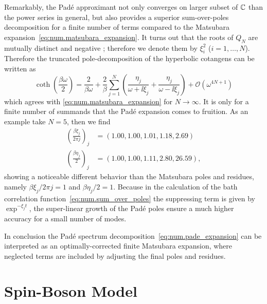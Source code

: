 Remarkably, the Padé approximant not only converges on larger subset of $\mathbb{C}$ than the power series in general, but also provides a superior sum-over-poles decomposition for a finite number of terms compared to the Matsubara expansion~\ref{eq:num.matsubara_expansion}.
It turns out that the roots of $Q_N$ are mutually distinct and negative \cite{HuXuYa10_pade}; therefore we denote them by $\xi_i^2$ ($i=1,\dots,N$).
Therefore the truncated pole-decomposition of the hyperbolic cotangens can be written as
\begin{equation}
  \coth\left( \frac{\beta\omega}{2} \right) = \frac{2}{\beta\omega} + \frac{2}{\beta} \sum_{j=1}^N \left( \frac{\eta_j}{\omega + \ii\xi_j} + \frac{\eta_j}{\omega - \ii\xi_j} \right) + \mathcal{O}(\omega^{4N+1})
  \label{eq:num.pade_expansion}
\end{equation}
which agrees with \autoref{eq:num.matsubara_expansion} for $N\to\infty$.
It is only for a finite number of summands that the Padé expansion comes to fruition.
As an example take $N=5$, then we find
\begin{align*}
  \left( \frac{\beta \xi_j}{2\pi j} \right)_j &= (1.00, 1.00, 1.01, 1.18, 2.69) \\
  \left( \frac{\beta\eta_j}{2} \right)_j &= (1.00, 1.00, 1.11, 2.80, 26.59),
\end{align*}
showing a noticeable different behavior than the Matsubara poles and residues, namely $\beta \xi_j/2\pi j = 1$ and $\beta \eta_j/2 = 1$.
Because in the calculation of the bath correlation function~\ref{eq:num.sum_over_poles} the suppressing term is given by $\exp^{-\xi_j t}$, the super-linear growth of the Padé poles ensure a much higher accuracy for a small number of modes.

In conclusion the Padé spectrum decomposition~\ref{eq:num.pade_expansion} can be interpreted as an optimally-corrected finite Matsubara expansion, where neglected terms are included by adjusting the final poles and residues.


\section{Spin-Boson Model}
\label{sec:num.spin_boson}
%


